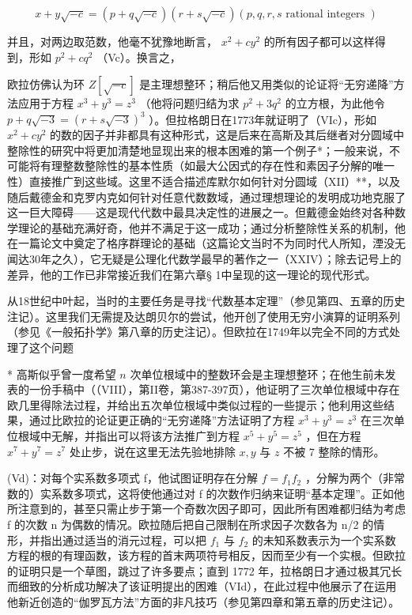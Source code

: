\[
x + y \sqrt {- c} = (p + q \sqrt {- c}) (r + s \sqrt {- c}) (p, q, r, s \text { rational   integers })
\]

并且，对两边取范数，他毫不犹豫地断言， \(x^{2} + cy^{2}\) 的所有因子都可以这样得到，形如 \(p^{2} + cq^{2}\) （Vc）。换言之，

欧拉仿佛认为环 \(Z[\sqrt{-c}]\) 是主理想整环；稍后他又用类似的论证将“无穷递降”方法应用于方程 \(x^{3} + y^{3} = z^{3}\) （他将问题归结为求 \(p^{2} + 3q^{2}\) 的立方根，为此他令 \(p + q\sqrt{-3} = (r + s\sqrt{-3})^{3}\) ）。但拉格朗日在1773年就证明了（VIc），形如 \(x^{2} + cy^{2}\) 的数的因子并非都具有这种形式，这是后来在高斯及其后继者对分圆域中整除性的研究中将更加清楚地显现出来的根本困难的第一个例子*；一般来说，不可能将有理整数整除性的基本性质（如最大公因式的存在性和素因子分解的唯一性）直接推广到这些域。这里不适合描述库默尔如何针对分圆域（XII）**，以及随后戴德金和克罗内克如何针对任意代数数域，通过理想理论的发明成功地克服了这一巨大障碍——这是现代代数中最具决定性的进展之一。但戴德金始终对各种数学理论的基础充满好奇，他并不满足于这一成功；通过分析整除性关系的机制，他在一篇论文中奠定了格序群理论的基础（这篇论文当时不为同时代人所知，湮没无闻达30年之久），它无疑是公理化代数学最早的著作之一（XXIV）；除去记号上的差异，他的工作已非常接近我们在第六章§ 1中呈现的这一理论的现代形式。

从18世纪中叶起，当时的主要任务是寻找“代数基本定理”（参见第四、五章的历史注记）。这里我们无需提及达朗贝尔的尝试，他开创了使用无穷小演算的证明系列（参见《一般拓扑学》第八章的历史注记）。但欧拉在1749年以完全不同的方式处理了这个问题

* 高斯似乎曾一度希望 \(n\) 次单位根域中的整数环会是主理想整环；在他生前未发表的一份手稿中（（VIII），第II卷，第387-397页），他证明了三次单位根域中存在欧几里得除法过程，并给出五次单位根域中类似过程的一些提示；他利用这些结果，通过比欧拉的论证更正确的“无穷递降”方法证明了方程 \(x^3 + y^3 = z^3\) 在三次单位根域中无解，并指出可以将该方法推广到方程 \(x^5 + y^5 = z^5\) ，但在方程 \(x^7 + y^7 = z^7\) 处止步，说在这里无法先验地排除 \(x, y\) 与 \(z\) 不被 7 整除的情形。

(Vd)：对每个实系数多项式 f，他试图证明存在分解 \(f = f_{1}f_{2}\) ，分解为两个（非常数的）实系数多项式，这将使他通过对 f 的次数作归纳来证明“基本定理”。正如他所注意到的，甚至只需止步于第一个奇数次因子即可，因此所有困难都归结为考虑 f 的次数 n 为偶数的情况。欧拉随后把自己限制在所求因子次数各为 n/2 的情形，并指出通过适当的消元过程，可以把 \(f_{1}\) 与 \(f_{2}\) 的未知系数表示为一个实系数方程的根的有理函数，该方程的首末两项符号相反，因而至少有一个实根。但欧拉的证明只是一个草图，跳过了许多要点；直到 1772 年，拉格朗日才通过极其冗长而细致的分析成功解决了该证明提出的困难（VId），在此过程中他展示了在运用他新近创造的“伽罗瓦方法”方面的非凡技巧（参见第四章和第五章的历史注记）。

